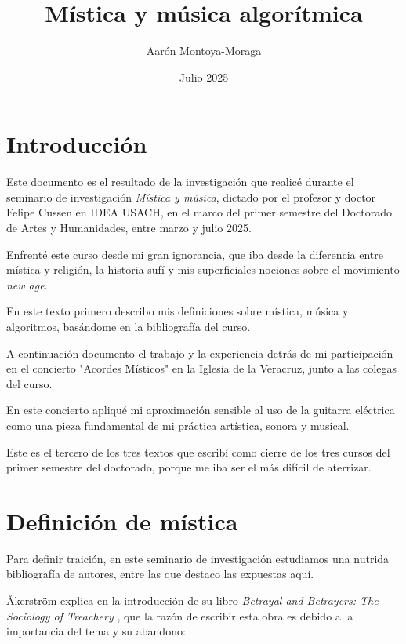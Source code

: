 \documentclass{article}
\title{Mística y música algorítmica}
\author{Aarón Montoya-Moraga}
\date{Julio 2025}
\begin{document}
\maketitle

\renewcommand*\contentsname{Tabla de contenidos}

\tableofcontents

\clearpage

\section{Introducción}

Este documento es el resultado de la investigación que realicé durante el seminario de investigación \textit{Mística y música}, dictado por el profesor y doctor Felipe Cussen en IDEA USACH, en el marco del primer semestre del Doctorado de Artes y Humanidades, entre marzo y julio 2025.

Enfrenté este curso desde mi gran ignorancia, que iba desde la diferencia entre mística y religión, la historia sufí y mis superficiales nociones sobre el movimiento \textit{new age}.

En este texto primero describo mis definiciones sobre mística, música y algoritmos, basándome en la bibliografía del curso. 

A continuación documento el trabajo y la experiencia detrás de mi participación en el concierto "Acordes Místicos" en la Iglesia de la Veracruz, junto a las colegas del curso.

En este concierto apliqué mi aproximación sensible al uso de la guitarra eléctrica como una pieza fundamental de mi práctica artística, sonora y musical.

Este es el tercero de los tres textos que escribí como cierre de los tres cursos del primer semestre del doctorado, porque me iba ser el más difícil de aterrizar.

\clearpage

\section{Definición de mística}

Para definir traición, en este seminario de investigación estudiamos una nutrida bibliografía de autores, entre las que destaco las expuestas aquí.

Åkerström explica en la introducción de su libro \textit{Betrayal and Betrayers: The Sociology of Treachery} , que la razón de escribir esta obra es debido a la importancia del tema y su abandono:
\end{document}
